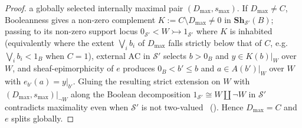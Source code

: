 \begin{proof}
a globally selected internally maximal pair $(D_{\max}, s_{\max})$. If $D_{\max} \neq C$, Booleanness gives a non-zero complement $K := C \setminus D_{\max} \neq 0$ in $\mathbf{Sh}_{\mathcal{S}'}(B)$; passing to its non-zero support locus $0_{\mathcal{S}'} < W \rightarrowtail 1_{\mathcal{S}'}$ where $K$ is inhabited (equivalently where the extent $\bigvee_i b_i$ of $D_{\max}$ falls strictly below that of $C$, e.g.\ $\bigvee_i b_i < 1_B$ when $C = 1$), external $\mathrm{AC}$ in $\mathcal{S}'$ selects $b > 0_B$ and $y \in K(b)|_W$ over $W$, and sheaf-epimorphicity of $e$ produces $0_B < b' \le b$ and $a \in A(b')|_W$ over $W$ with $e_{b'}(a) = y|_{b'}$. Gluing the resulting strict extension on $W$ with $(D_{\max}, s_{\max})|_{\neg W}$ along the Boolean decomposition $1_{\mathcal{S}'} \cong W \amalg \neg W$ in $\mathcal{S}'$ contradicts maximality even when $\mathcal{S}'$ is not two-valued~\cite{Barr74} (\cite[\S D4.5]{Johnstone02}). Hence $D_{\max} = C$ and $e$ splits globally.


\end{proof}
